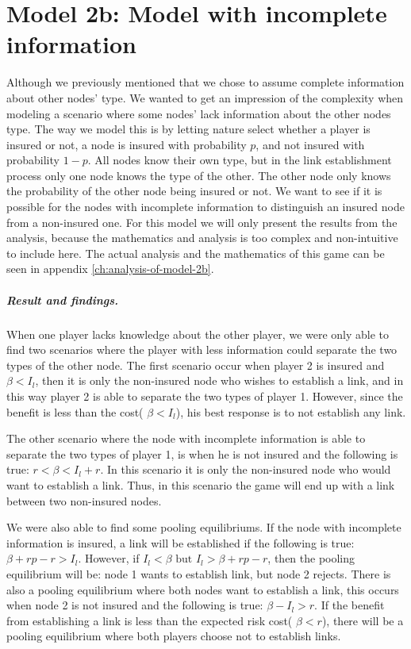 \section{Model 2b: Model with incomplete information}
\label{Model with incomplete information}
Although we previously mentioned that we chose to assume complete information about other nodes' type. We wanted to get an impression of the complexity when modeling a scenario where some nodes' lack information about the other nodes type. The way we model this is by letting nature select whether a player is insured or not, a node is insured with probability $p$, and not insured with probability $1-p$. 
All nodes know their own type, but in the link establishment process only one node knows the type of the other. The other node only knows the probability of the other node being insured or not. 
We want to see if it is possible for the nodes with incomplete information to distinguish an insured node from a non-insured one.
For this model we will only present the results from the analysis, because the mathematics and analysis is too complex and non-intuitive to include here. The actual analysis and the mathematics of this game can be seen in appendix \ref{ch:analysis-of-model-2b}.

\subparagraph{Result and findings.}
When one player lacks knowledge about the other player, we were only able to find two scenarios where the player with less information could separate the two types of the other node. The first scenario occur when player 2 is insured and $\beta<I_{l}$, then it is only the non-insured node who wishes to establish a link, and in this way player 2 is able to separate the two types of player 1. However, since the benefit is less than the cost( $\beta<I_{l}$), his best response is to not establish any link.

The other scenario where the node with incomplete information is able to separate the two types of player 1, is when he is not insured and the following is true: $r<\beta<I_{l}+r$. In this scenario it is only the non-insured node who would want to establish a link. Thus, in this scenario the game will end up with a link between two non-insured nodes.

We were also able to find some pooling equilibriums. If the node with incomplete information is insured, a link will be established if the following is true: $\beta+rp-r>I_{l}$. However, if $I_{l}<\beta \text{ but } I_{l}>\beta+rp-r$, then the pooling equilibrium will be: node 1 wants to establish link, but node 2 rejects.
There is also a pooling equilibrium where both nodes want to establish a link, this occurs when node 2 is not insured and the following is true: $\beta-I_{l}>r$. If the benefit from establishing a link is less than the expected risk cost( $\beta<r$), there will be a pooling equilibrium where both players choose not to establish links. 


